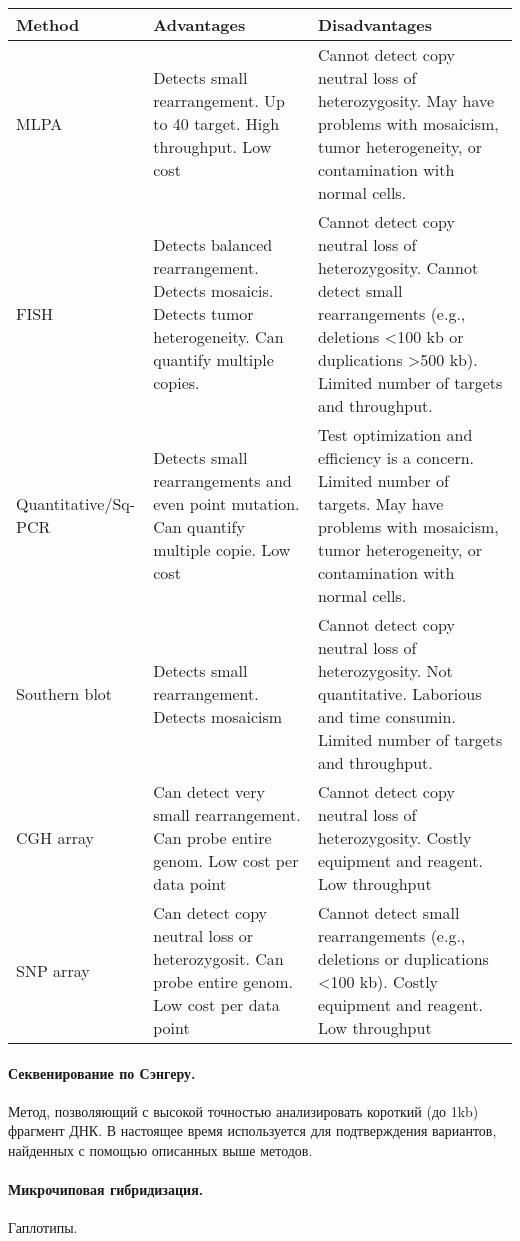 \documentclass[a4paper,12pt]{article}
\begin{document}
\begin{tabular}{| p{}  | p{} | p{} |}
\hline
Method & Advantages & Disadvantages \\
\hline
MLPA & Detects small rearrangement. Up to 40 target. High throughput. Low cost & Cannot detect copy neutral loss of heterozygosity. May have problems with mosaicism, tumor heterogeneity, or contamination with normal cells. \\
\hline
FISH & Detects balanced rearrangement. Detects mosaicis. Detects tumor heterogeneity. Can quantify multiple copies. & Cannot detect copy neutral loss of heterozygosity. Cannot detect small rearrangements (e.g., deletions <100 kb or duplications >500 kb). Limited number of targets and throughput. \\
\hline
Quantitative/Sq-PCR & Detects small rearrangements and even point mutation. Can quantify multiple copie. Low cost & Test optimization and efficiency is a concern. Limited number of targets. May have problems with mosaicism, tumor heterogeneity, or contamination with normal cells. \\
\hline
Southern blot & Detects small rearrangement. Detects mosaicism & Cannot detect copy neutral loss of heterozygosity. Not quantitative. Laborious and time consumin. Limited number of targets and throughput. \\
\hline
CGH array & Can detect very small rearrangement. Can probe entire genom. Low cost per data point & Cannot detect copy neutral loss of heterozygosity. Costly equipment and reagent. Low throughput \\
\hline
SNP array & Can detect copy neutral loss or heterozygosit. Can probe entire genom. Low cost per data point & Cannot detect small rearrangements (e.g., deletions or duplications <100 kb). Costly equipment and reagent. Low throughput \\
\hline
\end{tabular}

\paragraph{Секвенирование по Сэнгеру.}
Метод, позволяющий с высокой точностью анализировать короткий (до 1kb) фрагмент ДНК\cite{sanger}.
В настоящее время используется для подтверждения вариантов, найденных с помощью описанных выше методов.

\paragraph{Микрочиповая гибридизация.}
Гаплотипы.
\end{document}
